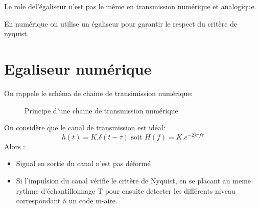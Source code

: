 \documentclass[main.tex]{subfiles}
\begin{document}
\begin{rem}
  Le role del'égaliseur n'est pas le même en transmission numérique et analogique.
\end{rem}
En numérique on utilise un égaliseur pour garantir le respect du critère de nyquist.
\section{Egaliseur numérique }

On rappele le schéma de chaine de transimission numérique:
\begin{figure}[H]
  \centering
  \caption{Principe d'une chaine de transmission numérique}
\end{figure}
\begin{prop}

On considère que le canal de transmission est idéal:
\[
  h(t) = K. \delta(t-\tau) \text{ soit } H(f) = K.e^{-2j\pi f\tau}
\]
Alors :
\begin{itemize}
\item Signal en sortie du canal n'est pas déformé
\item Si l'impulsion du canal vérifie le critère de Nyquist, en se
  placant au meme rythme d'échantillonnage T pour ensuite detecter les
  différents niveau correspondant à un code m-aire.
\end{itemize}
\end{prop}
\end{document}
